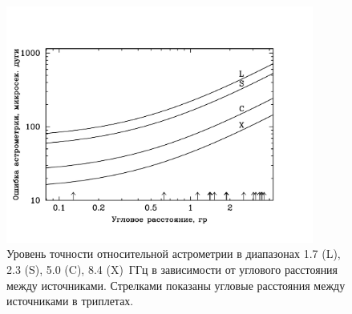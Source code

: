 \begin{figure}
 \includegraphics[width=0.9\textwidth]{rel_astrometry_errors.pdf}
 \caption{Уровень точности относительной астрометрии в диапазонах
          1.7 (L), 2.3 (S), 5.0 (C), 8.4 (X)~ГГц в зависимости от
          углового расстояния между источниками. Стрелками показаны
          угловые расстояния между источниками в триплетах.}
 \label{fig:astro_err}
\end{figure}

